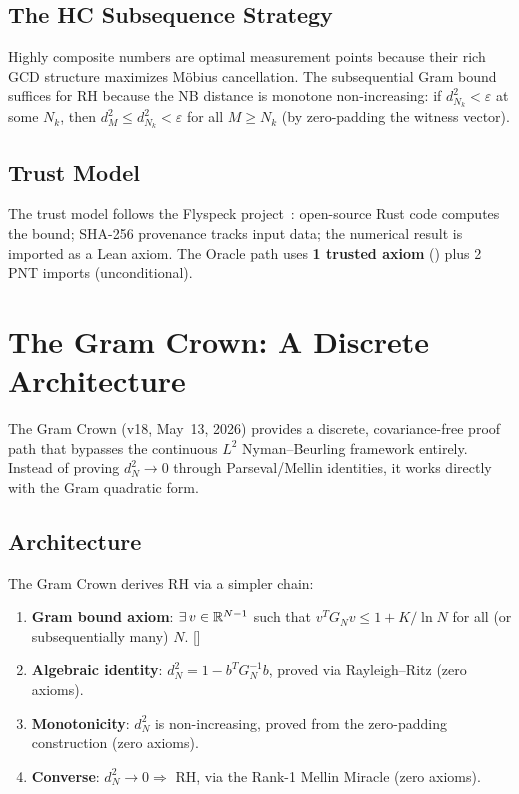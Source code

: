 \documentclass[11pt,a4paper]{article}
\begin{document}
\subsection{The HC Subsequence Strategy}

Highly composite numbers are optimal measurement points because their
rich GCD structure maximizes Möbius cancellation. The subsequential
Gram bound suffices for RH because the NB distance is monotone
non-increasing: if $d_{N_k}^2 < \varepsilon$ at some $N_k$, then
$d_M^2 \leq d_{N_k}^2 < \varepsilon$ for all $M \geq N_k$
(by zero-padding the witness vector).

\subsection{Trust Model}

The trust model follows the Flyspeck project~\cite{hales2017}:
open-source Rust code computes the bound; SHA-256 provenance tracks
input data; the numerical result is imported as a Lean axiom.
The Oracle path uses \textbf{1 trusted axiom} ()
plus 2 PNT imports (unconditional).

\section{The Gram Crown: A Discrete Architecture}
\label{sec:gramcrown}

The Gram Crown (v18, May~13, 2026) provides a discrete, covariance-free
proof path that bypasses the continuous $L^2$ Nyman--Beurling framework
entirely. Instead of proving $d_N^2 \to 0$ through Parseval/Mellin
identities, it works directly with the Gram quadratic form.

\subsection{Architecture}

The Gram Crown derives RH via a simpler chain:
\begin{enumerate}
  \item \textbf{Gram bound axiom}: $\exists\,v \in \mathbb{R}^{N-1}$ such that
    $v^T G_N v \leq 1 + K/\ln N$ for all (or subsequentially many) $N$.
    []
  \item \textbf{Algebraic identity}: $d_N^2 = 1 - b^T G_N^{-1} b$,
    proved via Rayleigh--Ritz (zero axioms).
  \item \textbf{Monotonicity}: $d_N^2$ is non-increasing, proved from
    the zero-padding construction (zero axioms).
  \item \textbf{Converse}: $d_N^2 \to 0 \Rightarrow$ RH, via the
    Rank-1 Mellin Miracle (zero axioms).
\end{enumerate}
\end{document}
